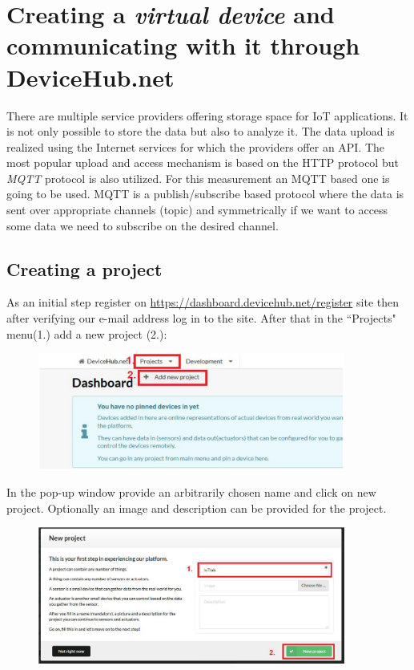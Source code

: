 \documentclass[a4paper]{article}
\begin{document}
\section{Creating a \emph{virtual device} and communicating with it through DeviceHub.net}

There are multiple service providers offering storage space for IoT applications. It is not only possible to store the data but also to analyze it. The data upload is realized using the Internet services for which the providers offer an API. The most popular upload and access mechanism is based on the HTTP protocol but \emph{MQTT} protocol is also utilized. For this measurement an MQTT based one is going to be used. MQTT is a publish/subscribe based protocol where the data is sent over appropriate channels (topic) and symmetrically if we want to access some data we need to subscribe on the desired channel.

\subsection{Creating a project}

As an initial step register on \url{https://dashboard.devicehub.net/register} site then after verifying our e-mail address log in to the site.
After that in the ``Projects" menu(1.) add a new project (2.):

\begin{figure}[H]
    \centering
    \includegraphics[width=0.9\textwidth]{figures/devicehub-addproject.png}
\end{figure}

In the pop-up window provide an arbitrarily chosen name and click on new project. Optionally an image and description can be provided for the project.

\begin{figure}[H]
    \centering
    \includegraphics[width=0.9\textwidth]{figures/devicehub-newproject.png}
\end{figure}
\end{document}
